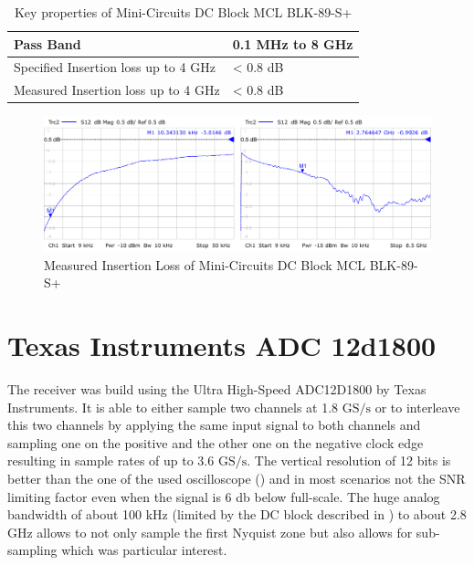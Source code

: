 \begin{table}[h]
  \centering
  \begin{tabular}{|l|l|}
    \hline
    Pass Band & 0.1 MHz to 8 GHz \\ \hline
    Specified Insertion loss up to 4 GHz & < 0.8 dB \\ \hline
    Measured Insertion loss up to 4 GHz & < 0.8 dB \\ \hline
  \end{tabular}
  \caption{Key properties of Mini-Circuits DC Block MCL BLK-89-S+}
  \label{tab:awg}
\end{table}

\begin{figure}
  \centering
  \includegraphics[width=\textwidth]{figures/MCL_BLK-89-S+_DC-Block_insertion_loss}
  \caption{Measured Insertion Loss of Mini-Circuits DC Block MCL BLK-89-S+}
  \label{fig:comp_dc_block_insertion_loss}
\end{figure}

\section{Texas Instruments ADC 12d1800}
\label{sec:comp_adc}
The receiver was build using the Ultra High-Speed ADC12D1800 by Texas Instruments.
It is able to either sample two channels at 1.8 $\text{GS}/\text{s}$ or to interleave
this two channels by applying the same input signal to both channels and sampling
one on the positive and the other one on the negative clock edge resulting in sample
rates of up to 3.6 $\text{GS}/\text{s}$. The vertical resolution of 12 bits is better
than the one of the used oscilloscope () and in most scenarios
not the \gls{SNR} limiting factor even when the signal is 6 db below full-scale.
The huge analog bandwidth of about 100 kHz
(limited by the \gls{DC} block described in ) to about
2.8 GHz allows to not only sample the first Nyquist zone but also allows
for sub-sampling which was particular interest. \\

